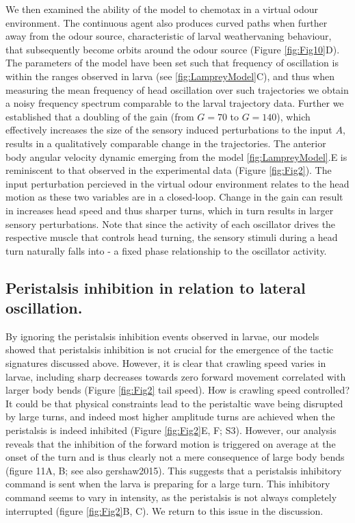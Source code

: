 \documentclass[10pt,a4paper]{article}
\begin{document}
We then examined the ability of the model to chemotax in a virtual odour environment. The continuous agent also produces curved paths when further away from the odour source, characteristic of larval weathervaning behaviour, that subsequently become orbits around the odour source (Figure \ref{fig:Fig10}D). The parameters of the model have been set such that frequency of oscillation is within the ranges observed in larva (see \ref{fig:LampreyModel}C), and thus when measuring the mean frequency of head oscillation over such trajectories we obtain a noisy frequency spectrum comparable to the larval trajectory data. Further we established that a doubling of the gain (from $G=70$ to $G=140$), which effectively increases the size of the sensory induced perturbations to the input $A$, results in a qualitatively comparable change in the trajectories. The anterior body angular velocity dynamic emerging from the model \ref{fig:LampreyModel}.E is reminiscent to that observed in the experimental data (Figure \ref{fig:Fig2}). The input perturbation percieved in the virtual odour environment relates to the head motion as these two variables are in a closed-loop. Change in the gain can result in increases head speed and thus sharper turns, which in turn results in larger sensory perturbations. Note that since the activity of each oscillator drives the respective muscle that controls head turning, the sensory stimuli during a head turn naturally falls into - a fixed phase relationship to the oscillator activity.


\subsection{Peristalsis inhibition in relation to lateral oscillation.}
By ignoring the peristalsis inhibition events observed in larvae, our models showed that peristalsis inhibition is not crucial for the emergence of the tactic signatures discussed above. However, it is clear that crawling speed varies in larvae, including sharp decreases towards zero forward movement correlated with larger body bends (Figure \ref{fig:Fig2} tail speed). How is crawling speed controlled? It could be that physical constraints lead to the peristaltic wave being disrupted by large turns, and indeed most higher amplitude turns are achieved when the peristalsis is indeed inhibited (Figure \ref{fig:Fig2}E, F; S3). However, our analysis reveals that the inhibition of the forward motion is triggered on average at the onset of the turn and is thus clearly not a mere consequence of large body bends (figure 11A, B; see also gershaw2015). This suggests that a peristalsis inhibitory command is sent when the larva is preparing for a large turn. This inhibitory command seems to vary in intensity, as the peristalsis is not always completely interrupted (figure \ref{fig:Fig2}B, C). We return to this issue in the discussion.
\end{document}
